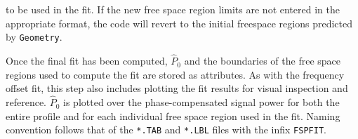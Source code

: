 \documentclass[titlepage, 12pt]{article}
\begin{document}
                to be used in the fit. If the new free space region limits
                are not entered in the appropriate format, the code will
                revert to the initial freespace regions predicted
                by \texttt{Geometry}.
                \par\hfill\par
                Once the final fit has been computed, $\hat{P}_0$ and the
                boundaries of the free space regions used to compute the fit
                are stored as attributes. As with the frequency offset
                fit, this step also includes plotting the fit results for
                visual inspection and reference. $\hat{P}_0$ is plotted over
                the phase-compensated signal power for both the entire profile
                and for each individual free space region used in the fit.
                Naming convention follows that of the \texttt{*.TAB} and
                \texttt{*.LBL} files with the infix \texttt{FSPFIT}.
\end{document}
